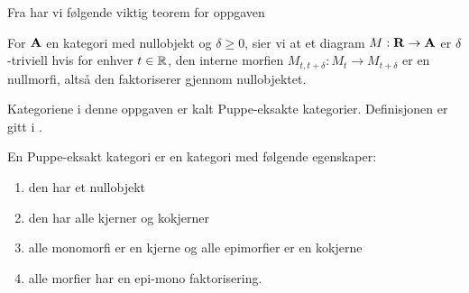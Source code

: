 Fra \citep[definisjon 1.3]{Bauer2020} har vi følgende
viktig teorem for oppgaven

\begin{definisjon}\label{def:trivialitet}
   For $\textnormal{\textbf{{A}}}$ en kategori med nullobjekt og
   $\delta\geq0$, sier vi at et diagram $M:\textnormal{\textbf{{R}}}\to\textnormal{\textbf{{A}}}$
   er $\delta$-triviell hvis for enhver $t\in\mathbb{R}$, den
   interne morfien $M_{t,t+\delta}: M_t\to M_{t+\delta}$
   er en nullmorfi, altså den faktoriserer gjennom
   nullobjektet.
\end{definisjon}

Kategoriene i denne oppgaven er kalt Puppe-eksakte
kategorier. Definisjonen er gitt i \citep[definisjon
2.1]{Bauer2020}.

\begin{definisjon}\label{def:Puppe-eksakt}
   En Puppe-eksakt kategori er en kategori med følgende
   egenskaper:
  \begin{enumerate}
    \item den har et nullobjekt
    \item den har alle kjerner og kokjerner
    \item alle monomorfi er en kjerne og alle epimorfier
      er en kokjerne
    \item alle morfier har en epi-mono faktorisering.
  \end{enumerate}
\end{definisjon}


